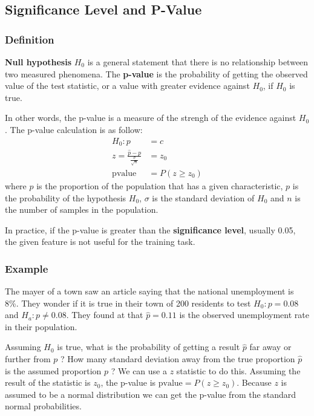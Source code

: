 \documentclass[12pt]{report}
\begin{document}
        \subsection{Significance Level and P-Value}
            \subsubsection{Definition}
                \textbf{Null hypothesis} $H_0$ is a general statement that there is no relationship between two measured phenomena. The \textbf{p-value} is the probability of getting the observed value of the test statistic, or a value with greater evidence against $H_0$, if $H_0$ is true.
                
                In other words, the p-value is a measure of the strengh of the evidence against $H_0$. The p-value calculation is as follow:
                \begin{align}
                    H_0 : p &= c\\
                    z = \frac{\hat{p} - p}{\frac{\sigma}{\sqrt{n}}} &= z_0 \\
                    \text{pvalue} &= P(z \geq z_0)
                \end{align}
                where $\hat{p}$ is the proportion of the population that has a given characteristic, $p$ is the probability of the hypothesis $H_0$, $\sigma$ is the standard deviation of $H_0$ and $n$ is the number of samples in the population.
            
                In practice, if the p-value is greater than the \textbf{significance level}, usually 0.05, the given feature is not useful for the training task.
           \subsubsection{Example}
                The mayer of a town saw an article saying that the national unemployment is 8\%. They wonder if it is true in their town of 200 residents to test $H_0 : p = 0.08$ and $H_a : p \neq 0.08$. They found at that $\hat{p} = 0.11$ is the observed unemployment rate in their population.
                
                Assuming $H_0$ is true, what is the probability of getting a result $\hat{p}$ far away or further from $p$ ? How many standard deviation away from the true proportion $\hat{p}$ is the assumed proportion $p$ ? We can use a $z$ statistic to do this. Assuming the result of the statistic is $z_0$, the p-value is $\text{pvalue} = P(z \geq z_0)$. Because $z$ is assumed to be a  normal distribution we can get the p-value from the standard normal probabilities.
                
\end{document}
